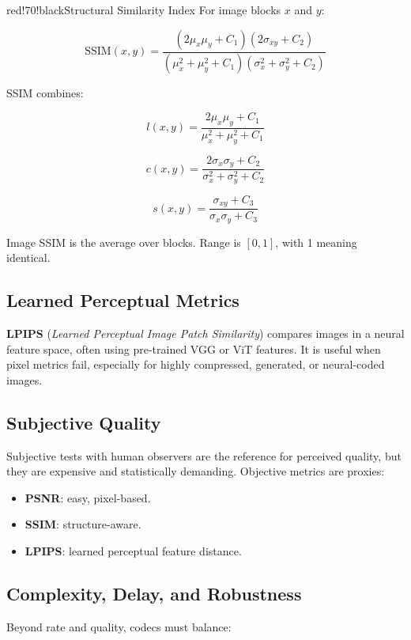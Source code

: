 \begin{calloutbox}{red!70!black}{Structural Similarity Index}
For image blocks $x$ and $y$:

\[
\text{SSIM}(x,y)=
\frac{(2\mu_x\mu_y+C_1)(2\sigma_{xy}+C_2)}
{(\mu_x^2+\mu_y^2+C_1)(\sigma_x^2+\sigma_y^2+C_2)}
\]

SSIM combines:

\[
l(x,y)=\frac{2\mu_x\mu_y+C_1}{\mu_x^2+\mu_y^2+C_1}
\]

\[
c(x,y)=\frac{2\sigma_x\sigma_y+C_2}{\sigma_x^2+\sigma_y^2+C_2}
\]

\[
s(x,y)=\frac{\sigma_{xy}+C_3}{\sigma_x\sigma_y+C_3}
\]

Image SSIM is the average over blocks. Range is $[0,1]$, with 1 meaning identical.
\end{calloutbox}

\subsection{Learned Perceptual Metrics}

\textbf{LPIPS} (\textit{Learned Perceptual Image Patch Similarity}) compares images in a neural feature space, often using pre-trained VGG or ViT features. It is useful when pixel metrics fail, especially for highly compressed, generated, or neural-coded images.

\subsection{Subjective Quality}

Subjective tests with human observers are the reference for perceived quality, but they are expensive and statistically demanding. Objective metrics are proxies:

\begin{itemize}
  \item \textbf{PSNR}: easy, pixel-based.
  \item \textbf{SSIM}: structure-aware.
  \item \textbf{LPIPS}: learned perceptual feature distance.
\end{itemize}

\subsection{Complexity, Delay, and Robustness}

Beyond rate and quality, codecs must balance:

